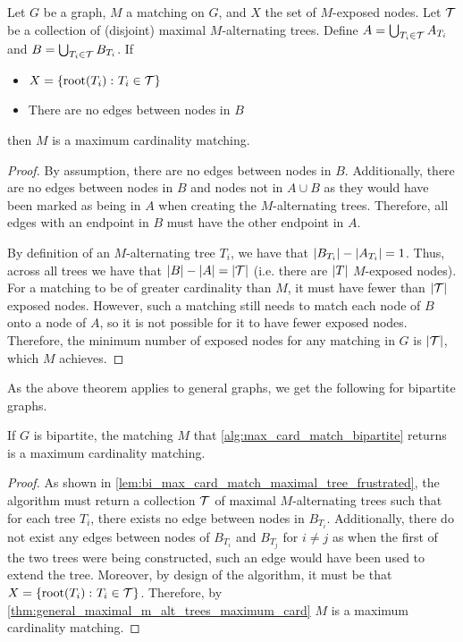 \begin{theorem}
    Let $G$ be a graph, $M$ a matching on $G$, and $X$ the set of $M$-exposed nodes. Let $\calT$ be a collection of (disjoint) maximal $M$-alternating trees.  
    Define $A = \bigcup_{T_i \in \calT} A_{T_i}$ and $B = \bigcup_{T_i \in \calT} B_{T_i}$. If 
    \begin{itemize}[label=--]
        \item $X = \lrc{\f[\mathrm{root}]{T_i} \colon T_i \in \calT}$
        \item There are no edges between nodes in $B$ 
    \end{itemize}
    then $M$ is a maximum cardinality matching. 
    \label{thm:general_maximal_m_alt_trees_maximum_card}
\end{theorem}
\begin{proof}
    By assumption, there are no edges between nodes in $B$. Additionally, there are no edges 
    between nodes in $B$ and nodes not in $A \cup B$ as they would have been marked as being in $A$
    when creating the $M$-alternating trees. Therefore, all edges with an endpoint in $B$ must have the other endpoint in $A$. 

    By definition of an $M$-alternating tree $T_i$, we have that $\abs{B_{T_i}} - \abs{A_{T_i}} = 1$. Thus, across all trees we have that 
    $\abs{B} - \abs{A} = \abs{\calT}$ (i.e.\! there are $\abs{T}$ $M$-exposed nodes). 
    For a matching to be of greater cardinality than $M$, it must have fewer than $\abs{\calT}$ exposed nodes. 
    However, such a matching still needs to match each node of $B$ onto a node of $A$, so it is not possible for it to have fewer exposed nodes. 
    Therefore, the minimum number of exposed nodes for any matching in $G$ is $\abs{\calT}$, which $M$ achieves. 
\end{proof}

As the above theorem applies to general graphs, we get the following for bipartite graphs.  

\begin{theorem}
    If $G$ is bipartite, the matching $M$ that \cref{alg:max_card_match_bipartite} returns is a maximum cardinality matching. 
    \label{thm:bipartite_max_card_matching}
\end{theorem}
\begin{proof}
    As shown in \cref{lem:bi_max_card_match_maximal_tree_frustrated}, the algorithm must 
    return a collection $\calT$ of maximal $M$-alternating trees such that for each tree $T_i$, there exists no edge between nodes in $B_{T_i}$. 
    Additionally, there do not exist any edges between nodes of $B_{T_i}$ and $B_{T_j}$ for $i \neq j$ as when the first of the two trees 
    were being constructed, such an edge would have been used to extend the tree. 
    Moreover, by design of the algorithm, it must be that $X = \lrc{\f[\mathrm{root}]{T_i} \colon T_i \in \calT}$. 
    Therefore, by \cref{thm:general_maximal_m_alt_trees_maximum_card} $M$ is a maximum cardinality matching. 
\end{proof}

